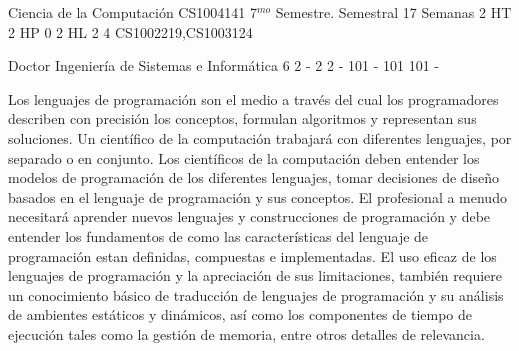 \documentclass[a4paper,8pt]{article}
\begin{document}
\setNombreProfesor{}
\setGradoProfesorAbreviado{}
\sylabusHeader

\academicaTable
{Ciencia de la Computación} %
{CS1004141} %
{7$^{mo}$ Semestre.} %
{Semestral} %
{17 Semanas} %
{2 HT} %
{2 HP} %
{0} %
{2 HL}  %
{2} %
{4} %
{CS1002219,CS1003124} %

\administrativaTable
{Doctor} %
{Ingeniería de Sistemas e Informática} %
{6} %
{2} %
{-} %
{2} %
{2} %
{-} %
{101} %
{-} %
{101} %
{101} %
{-} %


\begin{fundamentacion}
Los lenguajes de programación son el medio a través del cual los programadores describen con precisión los conceptos, 
formulan algoritmos y representan sus soluciones. Un científico de la computación trabajará con diferentes lenguajes, 
por separado o en conjunto. Los científicos de la computación deben entender los modelos de programación de los diferentes 
lenguajes, tomar decisiones de diseño basados en el lenguaje de programación y sus conceptos. El profesional a menudo 
necesitará aprender nuevos lenguajes y construcciones de programación y debe entender los fundamentos de como las 
características del lenguaje de programación estan definidas, compuestas e implementadas. El uso eficaz de los lenguajes 
de programación y la apreciación de sus limitaciones, también requiere un conocimiento básico de traducción de lenguajes 
de programación y su análisis de ambientes estáticos y dinámicos, así como los componentes de tiempo de ejecución tales 
como la gestión de memoria, entre otros detalles de relevancia.

\end{fundamentacion}

\begin{sumilla}
\item 
\item \PLLanguagePragmatics
\item \PLTypeSystems
\item \PLObjectOrientedProgramming
\item \PLFunctionalProgramming
\item \PLEventDrivenandReactiveProgramming
\item \PLLogicProgramming

\end{sumilla}
\end{document}

